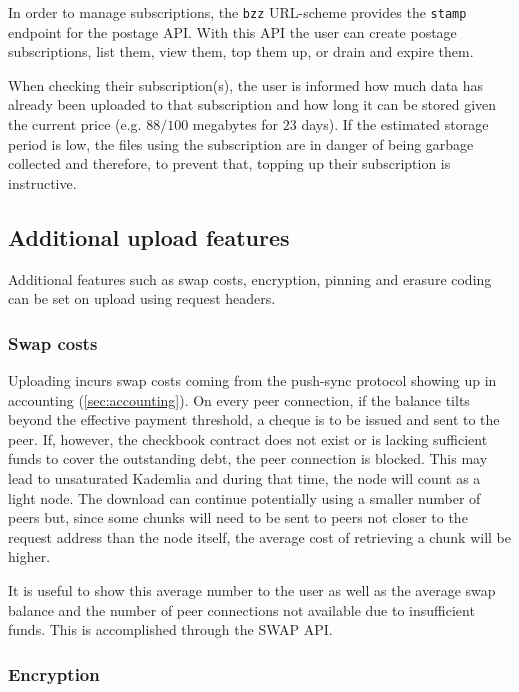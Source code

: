 In order to manage subscriptions, the \lstinline{bzz} URL-scheme provides the \lstinline{stamp} endpoint for the postage API. With this API the user can create postage subscriptions, list them, view them, top them up, or drain and expire them. 

When checking their subscription(s), the user is informed how much data has already been uploaded to that subscription and how long it can be stored given the current price (e.g. $88/100$ megabytes for $23$ days). If the estimated storage period is low, the files using the subscription are in danger of being garbage collected and therefore, to prevent that, topping up their subscription is instructive.


\subsection{Additional upload features \statusgreen}\label{sec:features}

Additional features such as swap costs, encryption, pinning and erasure coding can be set on upload using request headers. 


\subsubsection{Swap costs}

Uploading incurs swap costs coming from the push-sync protocol showing up in  accounting (\ref{sec:accounting}). On every peer connection, if the balance tilts beyond the effective payment threshold, a cheque is to be issued and sent to the peer. If, however, the checkbook contract does not exist or is lacking sufficient funds to cover the outstanding debt, the peer connection is blocked. This may lead to unsaturated Kademlia and during that time, the node will count as a light node. The download can continue potentially using a smaller number of peers but, since some chunks will need to be sent to peers not closer to the request address than the node itself, the average cost of retrieving a chunk will be higher. 

It is useful to show this average number to the user as well as the average swap balance and the number of peer connections not available due to insufficient funds. This is accomplished through the SWAP API.

\subsubsection{Encryption}

